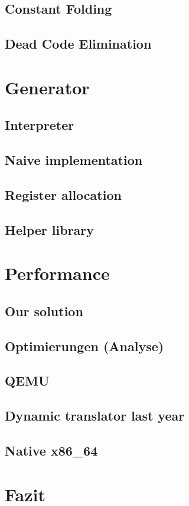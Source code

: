 \documentclass[course=eragp]{aspdoc}
\begin{document}
\subsection{Constant Folding}
\subsection{Dead Code Elimination}

\clearpage

\section{Generator}
\subsection{Interpreter}
\subsection{Naive implementation}
\subsection{Register allocation}
\subsection{Helper library}

\section{Performance}
\subsection{Our solution}
\subsection{Optimierungen (Analyse)}
\subsection{QEMU}
\subsection{Dynamic translator last year}
\subsection{Native x86\_64}

\section{Fazit}


{}
\end{document}
